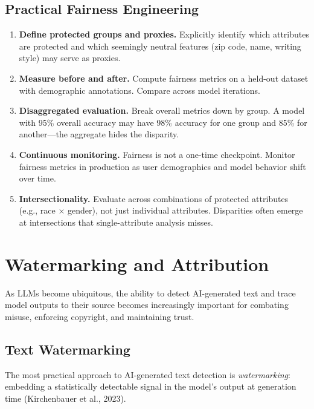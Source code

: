\subsection{Practical Fairness Engineering}

\begin{enumerate}[label=\textbf{\arabic*.}]
    \item \textbf{Define protected groups and proxies.}  Explicitly identify
    which attributes are protected and which seemingly neutral features (zip
    code, name, writing style) may serve as proxies.
    \item \textbf{Measure before and after.}  Compute fairness metrics on a
    held-out dataset with demographic annotations.  Compare across model
    iterations.
    \item \textbf{Disaggregated evaluation.}  Break overall metrics down by
    group.  A model with 95\% overall accuracy may have 98\% accuracy for one
    group and 85\% for another---the aggregate hides the disparity.
    \item \textbf{Continuous monitoring.}  Fairness is not a one-time
    checkpoint.  Monitor fairness metrics in production as user demographics
    and model behavior shift over time.
    \item \textbf{Intersectionality.}  Evaluate across combinations of
    protected attributes (e.g., race $\times$ gender), not just individual
    attributes.  Disparities often emerge at intersections that single-attribute
    analysis misses.
\end{enumerate}

\section{Watermarking and Attribution}
\label{sec:watermarking}

As LLMs become ubiquitous, the ability to detect AI-generated text and trace
model outputs to their source becomes increasingly important for combating
misuse, enforcing copyright, and maintaining trust.

\subsection{Text Watermarking}

The most practical approach to AI-generated text detection is \emph{watermarking}:
embedding a statistically detectable signal in the model's output at generation
time (Kirchenbauer et al., 2023).

